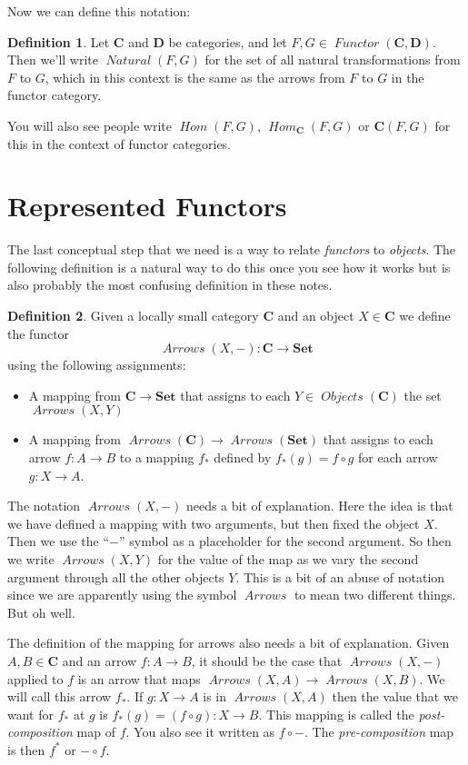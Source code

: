 \documentclass[12pt]{article}
\theoremstyle{definition}
\theoremstyle{definition}
\newtheorem{defn}{Definition}[]
\theoremstyle{definition}
\numberwithin{equation}{section}
\newcommand{\cat}[1]{\mathbf{#1}}      %
\newcommand{\fcat}[1]{{\mathbf {#1}}}    %
\newcommand{\CC}{\cat{C}}
\newcommand{\DD}{\cat{D}}
\DeclareMathOperator{\Arrows}{\mathit{Arrows}}
\DeclareMathOperator{\Objects}{\mathit{Objects}}
\DeclareMathOperator{\Hom}{\mathit{Hom}}
\DeclareMathOperator{\Nat}{\mathit{Natural}}
\DeclareMathOperator{\Fun}{\mathit{Functor}}
\newcommand{\Set}{\fcat{Set}}           %
\def\ni{\goodbreak\noindent}
\begin{document}
Now we can define this notation:

\begin{defn}
Let $\CC$ and $\DD$ be categories, and let $F, G \in \Fun(\CC, \DD)$. Then
we'll write $\Nat(F, G)$ for the set of all natural transformations from $F$ to $G$, which
in this context is the same as the arrows from $F$ to $G$ in the functor category.
\end{defn}
\ni
You will also see people write $\Hom(F, G)$, $\Hom_{\CC}(F,G)$ or $\CC(F, G)$ for this in the context
of functor categories.

\section{Represented Functors}

The last conceptual step that we need is a way to relate {\it functors} to {\it
objects}. The following definition is a natural way to do this once you see how it works
but is also probably the most confusing definition in these notes.

\begin{defn}
Given a locally small category $\CC$ and an object $X \in \CC$ we define the functor
$$
\Arrows(X,-) : \CC \to \Set
$$
using the following assignments:
\begin{itemize}
\item A mapping from $\CC \to \Set$ that assigns to each $Y \in \Objects(\CC)$ the set
$\Arrows(X,Y)$
\item A mapping from $\Arrows(\CC) \to \Arrows(\Set) $ that assigns to each arrow $f: A
\to B$ to a mapping $f_*$ defined by $f_*(g) = f\circ g$ for each arrow $g: X \to A$.
\end{itemize}
\end{defn}

The notation $\Arrows(X,-)$ needs a bit of explanation. Here the idea is that we have defined
a mapping with two arguments, but then fixed the object $X$. 
Then we use the ``$-$'' symbol as a 
placeholder for the second argument. So then we write $\Arrows(X,Y)$ for
the value of the map as we vary the second argument through all the other objects $Y$. 
This is a bit of an abuse of notation since we 
are apparently using the symbol $\Arrows$ to mean two different things. But oh well.

The definition of the mapping for arrows also needs a bit of explanation.
Given $A,B \in \CC$ and an arrow $f: A \to B$, it should be the case that $\Arrows(X,-)$ 
applied to $f$ is an arrow that maps $\Arrows(X,A) \to \Arrows(X,B)$.
We will call this arrow $f_*$.  
If $g: X \to A$ is in $\Arrows(X,A)$
then the value 
that we want for $f_*$ at $g$ is $f_*(g) = (f \circ g): X \to B$.
This mapping is called the {\it post-composition} map of $f$.
You also see it written as $f \circ -$.
The {\it pre-composition} map is then $f^*$ or $- \circ f$.
\end{document}
